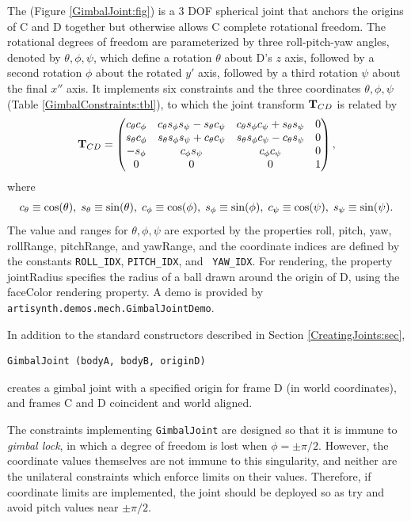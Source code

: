 The 
(Figure \ref{GimbalJoint:fig}) is a 3 DOF spherical joint that anchors
the origins of C and D together but otherwise allows C complete
rotational freedom. The rotational degrees of freedom are
parameterized by three roll-pitch-yaw angles, denoted by
$\theta, \phi, \psi$, which define a rotation $\theta$ about D's $z$
axis, followed by a second rotation $\phi$ about the rotated $y'$
axis, followed by a third rotation $\psi$ about the final $x''$ axis.
It implements six constraints and the three coordinates
$\theta, \phi, \psi$ (Table \ref{GimbalConstraints:tbl}), to which the
joint transform ${\bf T}_{CD}$ is related by
%
\begin{equation*}
{\bf T}_{CD} = \left(\begin{matrix}
c_\theta c_\phi & c_\theta s_\phi s_\psi - s_\theta c_\psi & c_\theta s_\phi c_\psi + s_\theta s_\psi & 0 \\
s_\theta c_\phi & s_\theta s_\phi s_\psi + c_\theta c_\psi & s_\theta s_\phi c_\psi - c_\theta s_\psi & 0 \\
-s_\phi & c_\phi s_\psi & c_\phi c_\psi & 0 \\
0 & 0 & 0 & 1 
\end{matrix}\right),
\end{equation*}
where 
%
\begin{equation*}
c_\theta \equiv \cos(\theta),\;
s_\theta \equiv \sin(\theta),\;
c_\phi \equiv \cos(\phi),\;
s_\phi \equiv \sin(\phi),\;
c_\psi \equiv \cos(\psi),\;
s_\psi \equiv \sin(\psi).
\end{equation*}
%
The value and ranges for $\theta, \phi, \psi$ are exported by the
properties {\sf roll}, {\sf pitch}, {\sf yaw}, {\sf rollRange}, {\sf
pitchRange}, and {\sf yawRange}, and the coordinate indices are
defined by the constants {\tt ROLL\_IDX}, {\tt PITCH\_IDX}, and {\tt
YAW\_IDX}. For rendering, the property {\sf jointRadius} specifies the
radius of a ball drawn around the origin of D, using the {\sf
faceColor} rendering property.  A demo is provided by {\tt
artisynth.demos.mech.GimbalJointDemo}.

In addition to the standard constructors described in
Section \ref{CreatingJoints:sec},
\begin{lstlisting}[]
  GimbalJoint (bodyA, bodyB, originD)
\end{lstlisting}
%
creates a gimbal joint with a specified origin for frame D (in world
coordinates), and frames C and D coincident and world aligned.

\begin{sideblock}
The constraints implementing {\tt GimbalJoint} are designed so that it
is immune to {\it gimbal lock}, in which a degree of freedom is lost
when $\phi = \pm \pi/2$. However, the coordinate values themselves are
not immune to this singularity, and neither are the unilateral
constraints which enforce limits on their values. Therefore, if
coordinate limits are implemented, the joint should be deployed so as try
and avoid pitch values near $\pm \pi/2$.
\end{sideblock}

